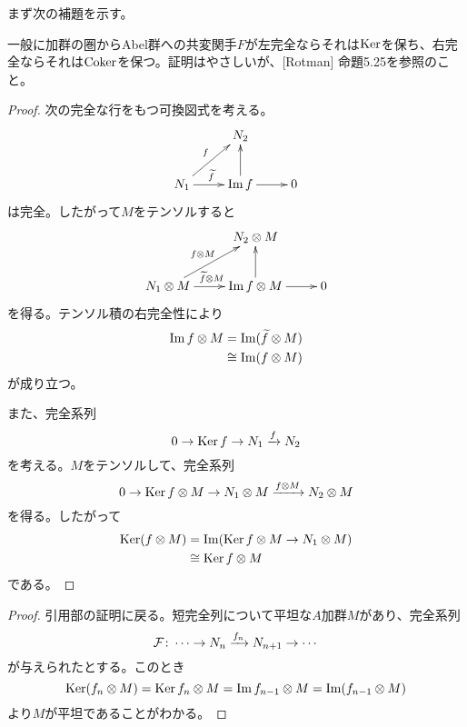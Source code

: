 
\begin{rem}
  まず次の補題を示す。
\end{rem}

\begin{rem}
  一般に加群の圏からAbel群への共変関手$F$が左完全ならそれは$\operatorname{Ker}$を保ち、右完全ならそれは$\operatorname{Coker}$を保つ。証明はやさしいが、[Rotman]\cite{Rotman} 命題5.25を参照のこと。
\end{rem}
\begin{proof}
  次の完全な行をもつ可換図式を考える。
  \[
  \xymatrix{
  {} & N_2 & {} \\
  N_1 \ar[r]^{\wt{f}} \ar[ur]^f & \Im f \ar[u] \ar[r] & 0
  }
  \]
  は完全。したがって$M$をテンソルすると
  \[
  \xymatrix{
  {} & N_2 \ts M & {} \\
  N_1 \ts M \ar[r]^{\wt{f} \ts M} \ar[ur]^{f \ts M} & \Im f \ts M  \ar[u] \ar[r] & 0
  }
  \]
  を得る。テンソル積の右完全性により
  \begin{align*}
    \operatorname{Im} f \otimes M &= \operatorname{Im} (\widetilde{f} \otimes M) \\
    &\cong \operatorname{Im} (f \otimes M)
  \end{align*}
  が成り立つ。

  また、完全系列
  \[
  0 \to \operatorname{Ker} f \to N_1 \xrightarrow{f} N_2
  \]
  を考える。$M$をテンソルして、完全系列
  \[
  0 \to \operatorname{Ker} f \otimes M \to N_1 \otimes M \xrightarrow{f \otimes M} N_2 \otimes M
  \]
  を得る。したがって
  \begin{align*}
    \operatorname{Ker} (f \otimes M) &= \operatorname{Im} (\operatorname{Ker} f \otimes M \to N_1 \otimes M) \\
    &\cong \operatorname{Ker} f \otimes M
  \end{align*}
  である。
\end{proof}

\begin{proof}
  引用部の証明に戻る。短完全列について平坦な$A$加群$M$があり、完全系列
  \[
  \mathcal{F} \colon  \cdots \to N_n \xrightarrow{f_n} N_{n+1} \to \cdots
  \]
  が与えられたとする。このとき
  \[
  \operatorname{Ker}( f_n \otimes M) = \operatorname{Ker} f_n \otimes M = \operatorname{Im} f_{n-1} \otimes M = \operatorname{Im} (f_{n-1} \otimes M)
  \]
  より$M$が平坦であることがわかる。
\end{proof}





